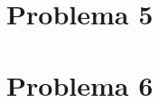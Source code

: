\documentclass{article}
\begin{document}
	
	\section{Problema 5}
	
	
	\section{Problema 6}
	
	
\end{document}
